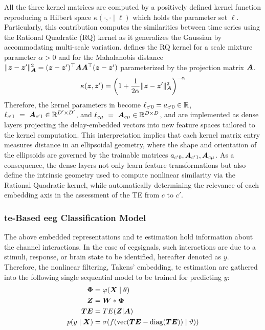 All the three kernel matrices are computed by a positively defined kernel function reproducing a Hilbert space $\kappa(\cdot, \cdot\mid\ell)$ which holds the parameter set $\ell$. Particularly, {this contribution computes} the similarities between time series using the Rational Quadratic (RQ) kernel as it generalizes the Gaussian by accommodating multi-scale variation.  defines the RQ kernel for a scale mixture parameter $\alpha>0$ and for the Mahalanobis distance $\|{\bm{z}} - {\bm{z}}'\|_{{\bm{A}}}^2 = ({\bm{z}} - {\bm{z}}')^\top {\bm{A}}{\bm{A}}^\top ({\bm{z}} - {\bm{z}}')$ parameterized by the projection matrix ${\bm{A}}$.
\begin{equation}\label{eq:rqk}
 \kappa({\bm{z}}, {\bm{z}}')  = \left(1 + \frac{1}{2\alpha}\|{\bm{z}} - {\bm{z}}'\|_{{\bm{A}}}^2 \right)^{-\alpha}
\end{equation}
Therefore, the kernel parameters in  become $\ell_{c'0}={a}_{c'0}\in\mathbb{R}$, $\ell_{c'1}~=~{\bm{A}}_{c'1}\in\mathbb{R}^{D'\times D'}$, and $\ell_{c\mu}~=~{\bm{A}}_{c\mu}\in\mathbb{R}^{D\times D}$, and are implemented as dense layers projecting the delay-embedded vectors into new feature spaces tailored to the kernel computation. This interpretation implies that each kernel matrix entry measures distance in an ellipsoidal geometry, where the shape and orientation of the ellipsoids are governed by the trainable matrices ${a}_{c'0}, {\bm{A}}_{c'1}, {\bm{A}}_{c\mu}$. As a consequence, the dense layers not only learn feature transformations but also define the intrinsic geometry used to compute nonlinear similarity via the Rational Quadratic kernel, while automatically determining the relevance of each embedding axis in the assessment of the TE from $c$ to $c'$.

\subsubsection{\gls{te}-Based \gls{eeg} Classification Model}

The above embedded representations and \gls{te} estimation hold information about the channel interactions. In the case of \gls{eeg}signals, such interactions are due to a stimuli, response, or brain state to be identified, hereafter denoted as $y$. Therefore, the nonlinear filtering, Takens' embedding, \gls{te} estimation are gathered into the following single sequential model to be trained for predicting $y$: 
\begin{subequations}
\begin{align}
    {\bm{\Phi}} &= \varphi({\bm{X}}\mid \theta)\label{eq:nonlinfilt}\\ 
    {\bm{Z}} &= {\bm{W}}*{\bm{\Phi}}\label{eq:emb}\\
    {\bm{TE}} &= TE({\bm{Z}}|{\bm{A}})\label{eq:TE_z}\\
    p(y \mid {\bm{X}}) &= \sigma(f(\mathrm{vec}({\bm{TE}} - \mathrm{diag}({\bm{TE}}))\mid\vartheta))\label{eq:p(y|x)}
\end{align}    
\end{subequations}


